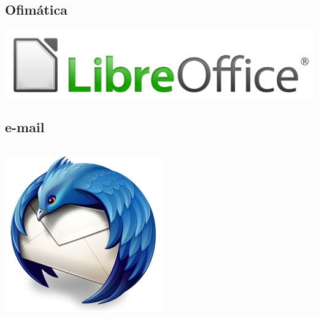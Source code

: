 \subsection{Ofimática}
\begin{frame}
        \includegraphics[width=\textwidth]{LibreOffice_logo.png}
\end{frame}

\subsection{e-mail}
\begin{frame}
    \begin{columns}
            \includegraphics[width=\textwidth]{Mozilla_Thunderbird_logo.png}
    \end{columns}
\end{frame}

